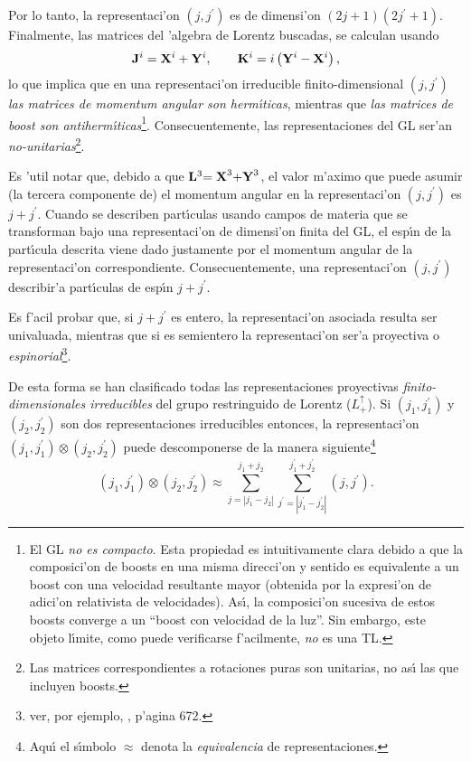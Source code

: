 Por lo tanto, la representaci'on $(j,j^{\prime })$ es de dimensi'on $%
(2j+1)(2j^{\prime }+1)$. Finalmente, las matrices del 'algebra de Lorentz
buscadas, se calculan usando 
\begin{equation}
{\bf J}^{i}={\bf X}^{i}+{\bf Y}^{i},\qquad {\bf K}^{i}=i\left( {\bf Y}^{i}-%
{\bf X}^{i}\right) ,  \label{lk}
\end{equation}
lo que implica que en una representaci'on irreducible finito-dimensional $%
(j,j^{\prime })$ {\em las matrices de momentum angular son herm{\'\i}ticas},
mientras que {\em las matrices de boost son antiherm{\'\i}ticas}\footnote{%
El GL {\em no es compacto}. Esta propiedad es intuitivamente clara debido a
que la composici'on de boosts en una misma direcci'on y sentido es
equivalente a un boost con una velocidad resultante mayor (obtenida por la
expresi'on de adici'on relativista de velocidades). As{\'\i}, la
composici'on sucesiva de estos boosts converge a un ``boost con velocidad
de la luz''. Sin embargo, este objeto l{\'\i}mite, como puede verificarse
f'acilmente, {\em no} es una TL.}. Consecuentemente, las representaciones
del GL ser'an {\em no-unitarias}\footnote{%
Las matrices correspondientes a rotaciones puras son unitarias, no as{\'\i}
las que incluyen boosts.}.

Es 'util notar que, debido a que ${\bf L}^3{\bf =X}^3{\bf +Y}^3$,
el valor m'aximo que puede asumir (la tercera componente de) el momentum
angular en la representaci'on $(j,j^{\prime })$ es $j+j^{\prime } $.
Cuando se describen part{\'{\i }}culas usando campos de materia que se
transforman bajo una representaci'on de dimensi'on finita del GL, el
esp{\'{\i }}n de la part{\'{\i }}cula descrita viene dado justamente por el
momentum angular de la representaci'on correspondiente. Consecuentemente,
una representaci'on $(j,j^{\prime })$ describir'a part{\'{\i }}culas
de esp{\'{\i }}n $j+j^{\prime }$.

Es f'acil probar que, si $j+j^{\prime }$ es entero, la representaci'on
asociada resulta ser univaluada, mientras que si es semientero la
representaci'on ser'a proyectiva o {\em espinorial}\footnote{%
ver, por ejemplo, \cite{Cornwell}, p'agina 672.}.

De esta forma se han clasificado todas las representaciones proyectivas {\em %
finito-dimensionales irreducibles} del grupo restringuido de Lorentz ($%
L_{+}^{\uparrow }$). Si $\left( j_{1},j_{1}^{\prime }\right) $ y $\left(
j_{2},j_{2}^{\prime }\right) $ son dos representaciones irreducibles
entonces, la representaci'on $\left( j_{1},j_{1}^{\prime }\right) \otimes
\left( j_{2},j_{2}^{\prime }\right) $ puede descomponerse de la manera
siguiente\footnote{%
Aqu{\'\i} el s{\'\i}mbolo $\approx $ denota la {\em equivalencia} de
representaciones.} \cite{Cornwell} 
\begin{equation}
\left( j_{1},j_{1}^{\prime }\right) \otimes \left( j_{2},j_{2}^{\prime
}\right) \approx \sum_{j=\left| j_{1}-j_{2}\right|
}^{j_{1}+j_{2}}\sum_{j^{\prime }=\left| j_{1}^{\prime }-j_{2}^{\prime
}\right| }^{j_{1}^{\prime }+j_{2}^{\prime }}\left( j,j^{\prime }\right) . 
\end{equation}

